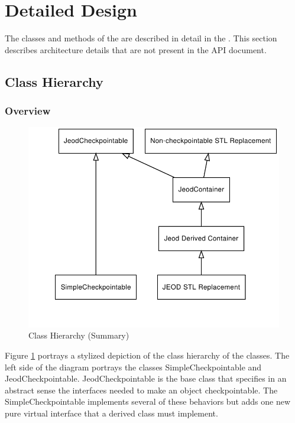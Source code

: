 \clearpage
\section{Detailed Design}
\label{sec:detailed_design}

The classes and methods of the \ModelDesc are described in detail in the
. This section describes architecture details that
are not present in the API document.

\subsection{Class Hierarchy}
\label{sec:spec_class_heirarchy}

\subsubsection{Overview}

\begin{figure}[htbp]
\centering
\includegraphics{basics}
\caption{Class Hierarchy (Summary)}
\label{fig:basics}
\end{figure}


Figure \ref{fig:basics} portrays a stylized depiction of the class hierarchy of
the \ModelDesc classes. The left side of the diagram portrays the classes
SimpleCheckpointable and JeodCheckpointable.
JeodCheckpointable is the
base class that specifies in an abstract sense the interfaces needed to
make an object checkpointable. The SimpleCheckpointable implements several
of these behaviors but adds one new pure virtual interface that a derived
class must implement.


